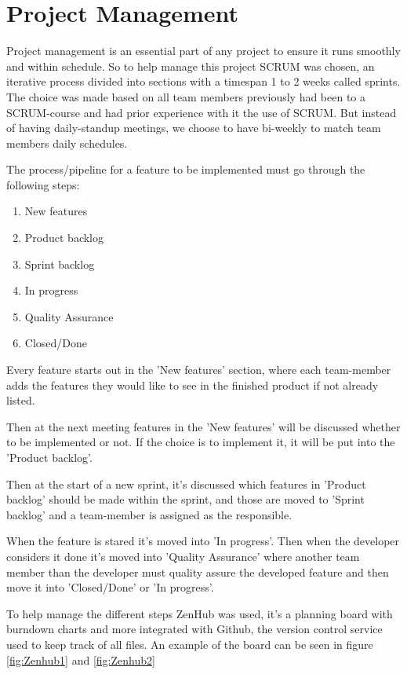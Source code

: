 \chapter{Project Management}

Project management is an essential part of any project to ensure it runs smoothly and within schedule. So to help manage this project SCRUM was chosen, an iterative process divided into sections with a timespan 1 to 2 weeks called sprints.
The choice was made based on all team members previously had been to a SCRUM-course and had prior experience with it the use of SCRUM. But instead of having daily-standup meetings, we choose to have bi-weekly to match team members daily schedules.

The process/pipeline for a feature to be implemented must go through the following steps:

\begin{enumerate}
	\item New features
	\item Product backlog
	\item Sprint backlog
	\item In progress
	\item Quality Assurance
	\item Closed/Done
\end{enumerate}

Every feature starts out in the 'New features' section, where each team-member adds the features they would like to see in the finished product if not already listed.

Then at the next meeting features in the 'New features' will be discussed whether to be implemented or not. If the choice is to implement it, it will be put into the 'Product backlog'.

Then at the start of a new sprint, it's discussed which features in 'Product backlog' should be made within the sprint, and those are moved to 'Sprint backlog' and a team-member is assigned as the responsible.

When the feature is stared it's moved into 'In progress'. Then when the developer considers it done it's moved into 'Quality Assurance' where another team member than the developer must quality assure the developed feature and then move it into 'Closed/Done' or 'In progress'.

To help manage the different steps ZenHub\cite{Zenhub} was used, it's a planning board with burndown charts and more integrated with Github\cite{Github}, the version control service used to keep track of all files. An example of the board can be seen in figure \ref{fig:Zenhub1} and \vref{fig:Zenhub2}

